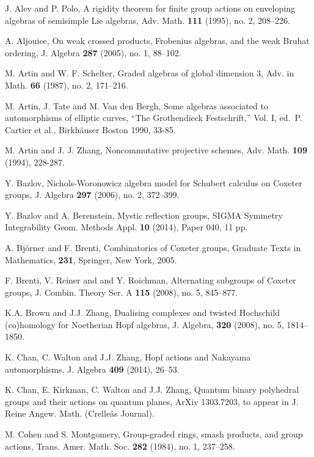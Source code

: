 \begin{thebibliography}{10}

J. Alev and P. Polo, 
A rigidity theorem for finite group actions on enveloping algebras of
semisimple Lie algebras, 
Adv. Math. {\bf 111} (1995), no. 2, 208--226. 

A. Aljouiee, 
On weak crossed products, Frobenius algebras, and the weak Bruhat ordering,
J. Algebra {\bf 287}  (2005),  no. 1, 88--102.

 M. Artin and W. F. Schelter,  
Graded algebras of global dimension $3$, 
Adv. in Math. {\bf 66} (1987), no. 2,
171--216.

M. Artin, J. Tate and M. Van den Bergh,
Some algebras associated to automorphisms of elliptic
curves, ``The Grothendieck Festschrift,''
Vol. I, ed.\ P. Cartier et al., Birkh\"{a}user Boston
1990, 33-85.

M. Artin and J. J. Zhang, Noncommutative projective
schemes, Adv. Math. {\bf 109} (1994), 228-287.

Y. Bazlov, 
Nichols-Woronowicz algebra model for Schubert calculus on Coxeter groups, 
J. Algebra {\bf 297}  (2006),  no. 2, 372--399. 

Y. Bazlov and A. Berenstein,
Mystic reflection groups, 
SIGMA Symmetry Integrability Geom. Methods Appl. {\bf 10} 
(2014), Paper 040, 11 pp. 

A. Bj\"{o}rner and F. Brenti, 
Combinatorics of Coxeter groups, 
Graduate Texts in Mathematics, {\bf 231}, Springer, New York, 2005.

F. Brenti, V. Reiner and and Y. Roichman, 
Alternating subgroups of Coxeter groups, 
J. Combin. Theory Ser. A {\bf 115} (2008), no. 5, 845--877.

K.A. Brown and J.J. Zhang, 
Dualising complexes and twisted Hochschild (co)homology for
Noetherian Hopf algebras,
J. Algebra, {\bf 320} (2008), no. 5, 1814--1850.

K. Chan, C. Walton and J.J. Zhang, 
Hopf actions and Nakayama automorphisms, 
J. Algebra {\bf 409}  (2014), 26--53.

K. Chan, E. Kirkman, C. Walton and J.J. Zhang, 
Quantum binary polyhedral groups
and their actions on quantum planes, ArXiv 1303.7203, 
to appear in J. Reine Angew. Math.
(Crelleâs Journal).

M. Cohen and S. Montgomery, 
Group-graded rings, smash products, and group actions,
Trans. Amer. Math. Soc. {\bf 282}  (1984),  no. 1, 237--258. 


\end{thebibliography}
